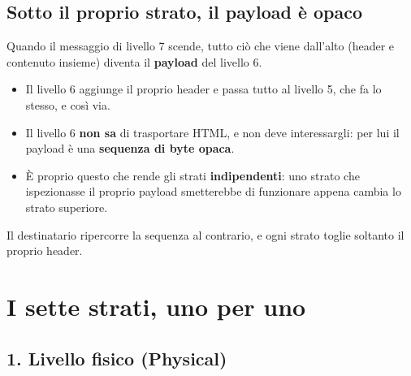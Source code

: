\subsection{Sotto il proprio strato, il payload è opaco}

Quando il messaggio di livello 7 scende, tutto ciò che viene dall'alto (header e contenuto insieme)
diventa il \textbf{payload} del livello 6.

\begin{itemize}
    \item Il livello 6 aggiunge il proprio header e passa tutto al livello 5, che fa lo stesso, e così via.
    \item Il livello 6 \textbf{non sa} di trasportare HTML, e non deve interessargli: per lui il payload è
          una \textbf{sequenza di byte opaca}.
    \item È proprio questo che rende gli strati \textbf{indipendenti}: uno strato che ispezionasse il
          proprio payload smetterebbe di funzionare appena cambia lo strato superiore.
\end{itemize}

Il destinatario ripercorre la sequenza al contrario, e ogni strato toglie soltanto il proprio header.


\section{I sette strati, uno per uno}

\subsection{1. Livello fisico (Physical)}

